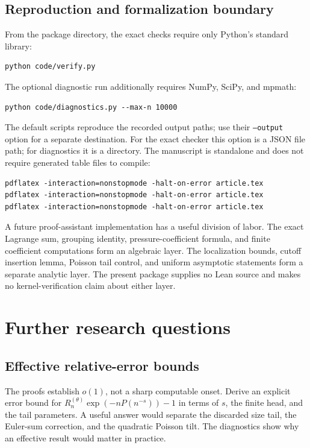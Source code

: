 \documentclass[11pt,a4paper]{article}
\theoremstyle{definition}
\theoremstyle{remark}
\numberwithin{equation}{section}
\begin{document}
\subsection{Reproduction and formalization boundary}
From the package directory, the exact checks require only Python's
standard library:
\begin{verbatim}
python code/verify.py
\end{verbatim}
The optional diagnostic run additionally requires NumPy, SciPy, and
mpmath:
\begin{verbatim}
python code/diagnostics.py --max-n 10000
\end{verbatim}
The default scripts reproduce the recorded output paths; use their
\texttt{--output} option for a separate destination. For the exact
checker this option is a JSON file path; for diagnostics it is a
directory. The manuscript is standalone and does not require generated
table files to compile:
\begin{verbatim}
pdflatex -interaction=nonstopmode -halt-on-error article.tex
pdflatex -interaction=nonstopmode -halt-on-error article.tex
pdflatex -interaction=nonstopmode -halt-on-error article.tex
\end{verbatim}

A future proof-assistant implementation has a useful division of labor.
The exact Lagrange sum, grouping identity, pressure-coefficient formula,
and finite coefficient computations form an algebraic layer. The
localization bounds, cutoff insertion lemma, Poisson tail control, and
uniform asymptotic statements form a separate analytic layer. The
present package supplies no Lean source and makes no kernel-verification
claim about either layer.

\section{Further research questions}\label{sec:future}

\subsection{Effective relative-error bounds}
The proofs establish $o(1)$, not a sharp computable onset. Derive an
explicit error bound for
$R_n^{(\theta)}\exp(-nP(n^{-s}))-1$ in terms of $s$, the finite head,
and the tail parameters. A useful answer would separate the discarded
size tail, the Euler-sum correction, and the quadratic Poisson tilt.
The diagnostics show why an effective result would matter in practice.
\end{document}
